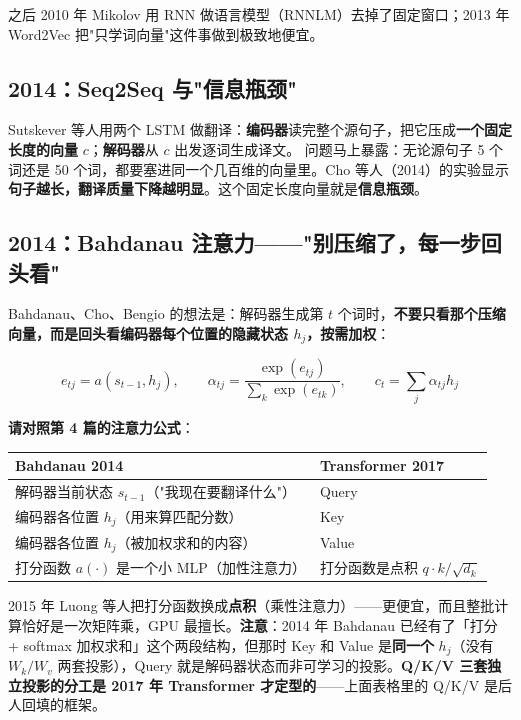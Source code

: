 之后 2010 年 Mikolov 用 RNN 做语言模型（RNNLM）去掉了固定窗口；2013 年 Word2Vec 把"只学词向量"这件事做到极致地便宜。

\subsection{2014：Seq2Seq 与"信息瓶颈"}

Sutskever 等人用两个 LSTM 做翻译：\textbf{编码器}读完整个源句子，把它压成\textbf{一个固定长度的向量} $c$；\textbf{解码器}从 $c$ 出发逐词生成译文。
问题马上暴露：无论源句子 5 个词还是 50 个词，都要塞进同一个几百维的向量里。Cho 等人（2014）的实验显示\textbf{句子越长，翻译质量下降越明显}。这个固定长度向量就是\textbf{信息瓶颈}。

\subsection{2014：Bahdanau 注意力——"别压缩了，每一步回头看"}

Bahdanau、Cho、Bengio 的想法是：解码器生成第 $t$ 个词时，\textbf{不要只看那个压缩向量，而是回头看编码器每个位置的隐藏状态 $h_j$，按需加权}：

\[
e_{tj} = a(s_{t-1}, h_j), \qquad \alpha_{tj} = \frac{\exp(e_{tj})}{\sum_k \exp(e_{tk})}, \qquad c_t = \sum_j \alpha_{tj} h_j
\]

\textbf{请对照第 4 篇的注意力公式}：

\begin{center}
\small
\begin{tabularx}{\textwidth}{p{3.5cm} X}
\toprule
\textbf{Bahdanau 2014} & \textbf{Transformer 2017} \\
\midrule
解码器当前状态 $s_{t-1}$（"我现在要翻译什么"） & Query \\
编码器各位置 $h_j$（用来算匹配分数） & Key \\
编码器各位置 $h_j$（被加权求和的内容） & Value \\
打分函数 $a(\cdot)$ 是一个小 MLP（加性注意力） & 打分函数是点积 $q \cdot k / \sqrt{d_k}$ \\
\bottomrule
\end{tabularx}
\end{center}

2015 年 Luong 等人把打分函数换成\textbf{点积}（乘性注意力）——更便宜，而且整批计算恰好是一次矩阵乘，GPU 最擅长。\textbf{注意}：2014 年 Bahdanau 已经有了「打分 + softmax 加权求和」这个两段结构，但那时 Key 和 Value 是\textbf{同一个} $h_j$（没有 $W_k/W_v$ 两套投影），Query 就是解码器状态而非可学习的投影。\textbf{Q/K/V 三套独立投影的分工是 2017 年 Transformer 才定型的}——上面表格里的 Q/K/V 是后人回填的框架。

